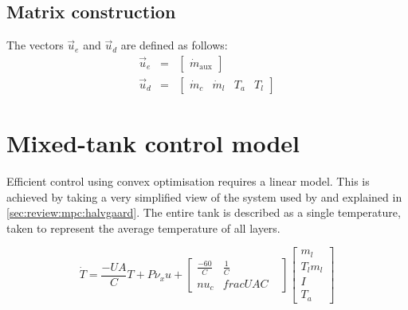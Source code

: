 \subsection{Matrix construction}

The vectors $\vec{u}_e$ and $\vec{u}_d$ are defined as follows:
\begin{eqnarray}
   \vec{u}_e &=& \left[\begin{array}{c} \dot{m}_{\text{aux}} \end{array} \right] \\
   \vec{u}_d &=& \left[\begin{array}{cccc} \dot{m}_c & \dot{m}_l & T_a & T_l \end{array} \right]
\end{eqnarray}

\section{Mixed-tank control model}

Efficient control using convex optimisation requires a linear model.
This is achieved by taking a very simplified view of the system used by  and explained in \autoref{sec:review:mpc:halvgaard}.
The entire tank is described as a single temperature, taken to represent the average temperature of all layers.

\begin{equation}
	\label{eq:tdot-halvgaard}
	\dot{T} = \frac{-UA}{C}T + P \nu_x u +
		\left[ \begin{array}{cccc}
			\frac{-60}{C} & \frac{1}{C} & \\nu_c & frac{UA}{C}
		\end{array} \right] \left[ \begin{array}{c}
			m_l \\ T_l m_l \\ I \\ T_a
		\end{array} \right]
\end{equation}
